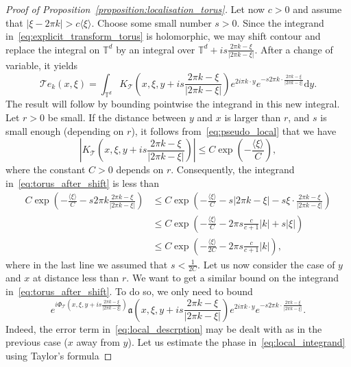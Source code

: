 \documentclass[AHL,Unicode,longabstracts,published]{cedram}
\newcommand{\p}[1]{\left(#1\right)}
\newcommand{\va}[1]{\left|#1\right|}
\newcommand{\brac}[1]{\langle #1 \rangle}
\newcommand{\clT}{\mathcal{T}}
\newcommand{\fka}{\mathfrak{a}}
\newcommand{\bbT}{\mathbb{T}}
\newcommand{\rmd}{\mathrm{d}}
\begin{document}
\begin{proof}[Proof of Proposition~\ref{proposition:localisation_torus}]
Let now $c> 0$ and assume that $\va{\xi - 2 \pi k} > c \brac{\xi}$. Choose some small number $s > 0$. Since the integrand in~\eqref{eq:explicit_transform_torus} is holomorphic, we may shift contour and replace the integral on $\bbT^d$ by an integral over $\bbT^d + is\frac{2 \pi k - \xi}{\va{2 \pi k - \xi}}$. After a change of variable, it yields
\begin{equation}\label{eq:torus_after_shift}
\clT e_k (x,\xi) = \int_{\bbT^d} K_{\clT}\left(x,\xi,y + i s \frac{2 \pi k - \xi}{\va{2 \pi k - \xi}}\right) e^{2 i \pi k \cdot y} e^{- s 2 \pi k \cdot \frac{2 \pi k - \xi}{\va{2 \pi k - \xi}}} \rmd y.
\end{equation}
The result will follow by bounding pointwise the integrand in this new integral. Let $r > 0$ be small. If the distance between $y$ and $x$ is larger than $r$, and $s$ is small enough (depending on $r$), it follows from~\eqref{eq:pseudo_local} that we have
\begin{equation*}
\va{K_{\clT}\left(x,\xi,y + i s \frac{2 \pi k - \xi}{\va{2 \pi k - \xi}}\right)} \leq C \exp\p{ - \frac{\brac{\xi}}{C}},
\end{equation*}
where the constant $C > 0$ depends on $r$. Consequently, the integrand in~\eqref{eq:torus_after_shift} is less than
\begin{equation*}
\begin{split}
C \exp\p{ - \frac{\brac{\xi}}{C} - s 2 \pi k \frac{2 \pi k - \xi}{\va{2 \pi k - \xi}} } & \leq C \exp\p{ - \frac{\brac{\xi}}{C} - s \va{2 \pi k - \xi} - s \xi \cdot \frac{2 \pi k - \xi}{\va{2 \pi k - \xi}} } \\
& \leq C \exp\p{ - \frac{\brac{\xi}}{C} - 2 \pi s \frac{c}{c+1} \va{k} + s \va{\xi} } \\
& \leq C \exp\p{ - \frac{\brac{\xi}}{2 C} - 2 \pi s \frac{c}{c+1} \va{k} },
\end{split}
\end{equation*}
where in the last line we assumed that $s < \frac{1}{2C}$. Let us now consider the case of $y$ and $x$ at distance less than $r$. We want to get a similar bound on the integrand in~\eqref{eq:torus_after_shift}. To do so, we only need to bound
\begin{equation}\label{eq:local_integrand}
e^{i\Phi_{\clT}\left(x,\xi,y + i s \frac{2 \pi k - \xi}{\va{2 \pi k - \xi}}\right)} \fka\left(x,\xi, y + i s \frac{2 \pi k - \xi}{\va{2 \pi k - \xi}}\right) e^{2 i \pi k \cdot y} e^{- s 2 \pi k \cdot \frac{2 \pi k - \xi}{\va{2 \pi k - \xi}}}.
\end{equation}
Indeed, the error term in~\eqref{eq:local_descrption} may be dealt with as in the previous case ($x$ away from $y$). Let us estimate the phase in~\eqref{eq:local_integrand} using Taylor's formula

\end{proof}
\end{document}
